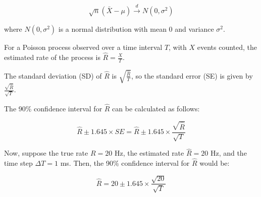 \[
\sqrt{n}(\bar{X}-\mu) \xrightarrow[]{d} N(0, \sigma^2)
\]

where $N(0, \sigma^2)$ is a normal distribution with mean 0 and variance $\sigma^2$.


For a Poisson process observed over a time interval $T$, with $X$ events counted, the estimated rate of the process is $\hat{R} = \frac{X}{T}$.

The standard deviation (SD) of $\hat{R}$ is $\sqrt{\frac{\hat{R}}{T}}$, so the standard error (SE) is given by $\frac{\sqrt{\hat{R}}}{\sqrt{T}}$. 

The 90\% confidence interval for $\hat{R}$ can be calculated as follows:

\[
\hat{R} \pm 1.645 \times SE = \hat{R} \pm 1.645 \times \frac{\sqrt{\hat{R}}}{\sqrt{T}}
\]

Now, suppose the true rate $R=20$ Hz, the estimated rate $\hat{R}=20$ Hz, and the time step $\Delta T=1$ ms. Then, the 90\% confidence interval for $\hat{R}$ would be:

\[
\hat{R} = 20 \pm 1.645 \times \frac{\sqrt{20}}{\sqrt{T}}
\]

